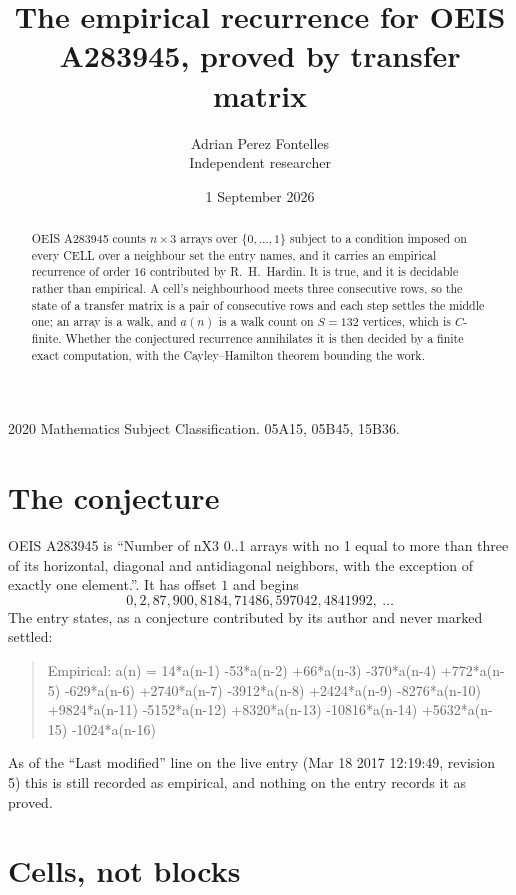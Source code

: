 \documentclass[11pt,a4paper]{article}
\title{The empirical recurrence for OEIS A283945, proved by transfer matrix}
\author{Adrian Perez Fontelles\\ \small Independent researcher}
\date{1 September 2026}
\theoremstyle{plain}
\theoremstyle{definition}
\begin{document}
\maketitle

\begin{abstract}
OEIS A283945 counts $n\times3$ arrays over $\{0,\dots,1\}$ subject to a condition imposed on
every CELL over a neighbour set the entry names, and it carries an empirical recurrence of
order $16$ contributed by R.~H.~Hardin. It is true, and it is decidable rather than
empirical. A cell's neighbourhood meets three consecutive rows, so the state of a transfer
matrix is a pair of consecutive rows and each step settles the middle one; an array is a
walk, and $a(n)$ is a walk count on $S=132$ vertices, which is $C$-finite. Whether the
conjectured recurrence annihilates it is then decided by a finite exact computation, with the
Cayley--Hamilton theorem bounding the work.
\end{abstract}

\noindent\small 2020 Mathematics Subject Classification. 05A15, 05B45, 15B36.\normalsize

\section{The conjecture}

OEIS A283945 is ``Number of nX3 0..1 arrays with no 1 equal to more than three of its horizontal, diagonal and antidiagonal neighbors, with the exception of exactly one element.''. It has offset $1$ and begins
\[
0, 2, 87, 900, 8184, 71486, 597042, 4841992,\ \dots
\]
The entry states, as a conjecture contributed by its author and never marked settled:
\begin{quote}
Empirical: a(n) = 14*a(n-1) -53*a(n-2) +66*a(n-3) -370*a(n-4) +772*a(n-5) -629*a(n-6) +2740*a(n-7) -3912*a(n-8) +2424*a(n-9) -8276*a(n-10) +9824*a(n-11) -5152*a(n-12) +8320*a(n-13) -10816*a(n-14) +5632*a(n-15) -1024*a(n-16)
\end{quote}
As of the ``Last modified'' line on the live entry (Mar 18 2017 12:19:49, revision 5) this is still
recorded as empirical, and nothing on the entry records it as proved.

\section{Cells, not blocks}
\end{document}
